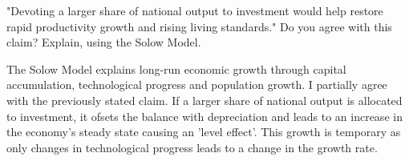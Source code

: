       "Devoting a larger share of national output to investment would help restore rapid productivity growth and rising living standards." 
      Do you agree with this claim? Explain, using the Solow Model. 


     \noindent The Solow Model explains long-run economic growth through capital accumulation, technological progress and population growth. I partially agree with the previously stated claim. If a larger share of national output 
     is allocated to investment, it ofsets the balance with depreciation and leads to an increase in the economy's steady state causing an 'level effect'. This growth is temporary as only changes in technological progress leads to 
     a change in the growth rate.

